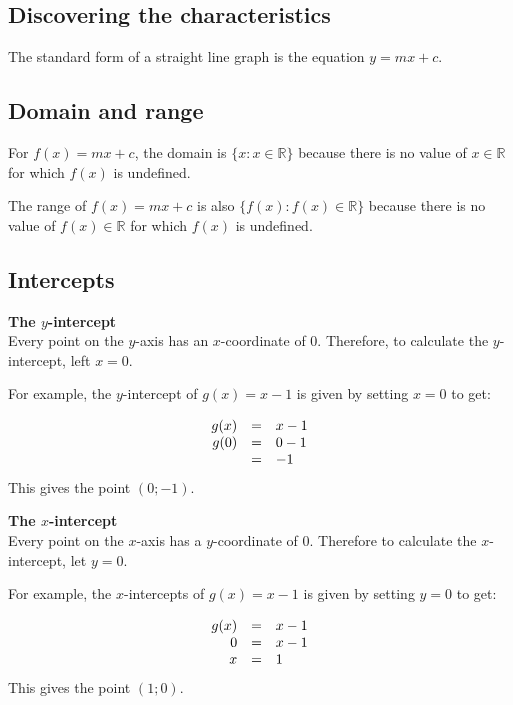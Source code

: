 
\subsection*{Discovering the characteristics} 
The standard form of a straight line graph is the equation $y=mx + c$. 
\subsection*{Domain and range}
\nopagebreak
For $f(x)=mx+c$, the domain is $\{x:x\in \mathbb{R}\}$ because there is no value of $x\in \mathbb{R}$ for which $f(x)$ is undefined.\par 
The range of $f(x)=mx+c$ is also $\{f(x):f(x)\in \mathbb{R}\}$ because there is no value of $f(x)\in \mathbb{R}$ for which $f(x)$ is undefined.\par 
\par 

\subsection*{Intercepts}
\textbf{The $y$-intercept}\\
Every point on the $y$-axis has an $x$-coordinate of $0$. Therefore, to calculate the $y$-intercept, left $x=0$.\par
For example, the $y$-intercept of $g(x)=x-1$ is given by setting $x=0$ to get:\par 

\begin{equation*}
\begin{array}{ccl}\hfill g(x)& =& x-1\hfill \\
\hfill g(0) &=& 0-1\hfill \\
& =& -1\hfill 
\end{array}
\end{equation*}
This gives the point $(0;-1)$.\par

\textbf{The $x$-intercept}\\
Every point on the $x$-axis has a $y$-coordinate of $0$. Therefore to calculate the $x$-intercept, let $y=0$. \par
For example, the $x$-intercepts of $g(x)=x-1$ is given by setting $y=0$ to get:\par 

\begin{equation*}
\begin{array}{ccl}\hfill g(x)& =& x-1\hfill \\
\hfill 0& =& x-1\hfill \\
\hfill x& =& 1\hfill 
\end{array}
\end{equation*}
This gives the point $(1;0)$.

